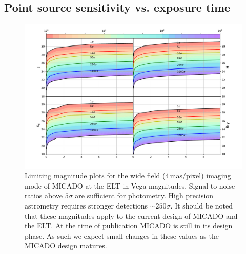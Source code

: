 \subsection{Point source sensitivity vs. exposure time}
\label{subsec:MICADO_sensitivities}

\begin{figure}

    \centering
    \includegraphics[width=\textwidth]{images/MICADO_SNR_Rainbow_JHKBrG_ab}

    \caption{Limiting magnitude plots for the wide field (4\,mas/pixel) imaging mode of MICADO at the ELT in Vega magnitudes.
    Signal-to-noise ratios above $5\sigma$ are sufficient for photometry.
    High precision astrometry requires stronger detections $\sim 250\sigma$.
    It should be noted that these magnitudes apply to the current design of MICADO and the ELT.
    At the time of publication MICADO is still in its design phase.
    As such we expect small changes in these values as the MICADO design matures.}
    
    \label{fig:point_source_sensitivities}
    
\end{figure}






